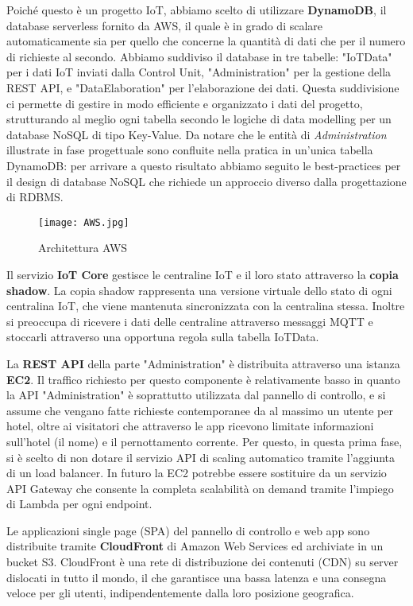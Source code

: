 Poiché questo è un progetto IoT, abbiamo scelto di utilizzare \textbf{DynamoDB}, il database serverless fornito da AWS, il quale è in grado di scalare automaticamente sia per quello che concerne la quantità di dati che per il numero di richieste al secondo.
Abbiamo suddiviso il database in tre tabelle: "IoTData" per i dati IoT inviati dalla Control Unit, "Administration" per la gestione della REST API, e "DataElaboration" per l'elaborazione dei dati. 
Questa suddivisione ci permette di gestire in modo efficiente e organizzato i dati del progetto, strutturando al meglio ogni tabella secondo le logiche di data modelling per un database NoSQL di tipo Key-Value.
Da notare che le entità di \textit{Administration} illustrate in fase progettuale sono confluite nella pratica in un'unica tabella DynamoDB: per arrivare a questo risultato abbiamo seguito le best-practices per il design di database NoSQL che richiede un approccio diverso dalla progettazione di RDBMS.

\begin{figure}[H]
    \texttt{[image: AWS.jpg]}
    \centering
    \caption[aws]{Architettura AWS}
    \label{fig:aws}
\end{figure}

Il servizio \textbf{IoT Core} gestisce le centraline IoT e il loro stato attraverso la \textbf{copia shadow}. La copia shadow rappresenta una versione virtuale dello stato di ogni centralina IoT, che viene mantenuta sincronizzata con la centralina stessa. Inoltre si preoccupa di ricevere i dati delle centraline attraverso messaggi MQTT e stoccarli attraverso una opportuna regola sulla tabella IoTData.

La \textbf{REST API} della parte "Administration" è distribuita attraverso una istanza \textbf{EC2}.
Il traffico richiesto per questo componente è relativamente basso in quanto la API "Administration" è soprattutto utilizzata dal pannello di controllo, e si assume che vengano fatte richieste contemporanee da al massimo un utente per hotel, oltre ai visitatori che attraverso le app ricevono limitate informazioni sull'hotel (il nome) e il pernottamento corrente.
Per questo, in questa prima fase, si è scelto di non dotare il servizio API di scaling automatico tramite l'aggiunta di un load balancer.
In futuro la EC2 potrebbe essere sostituire da un servizio API Gateway che consente la completa scalabilità on demand tramite l'impiego di Lambda per ogni endpoint.

Le applicazioni single page (SPA) del pannello di controllo e web app sono distribuite tramite \textbf{CloudFront} di Amazon Web Services ed archiviate in un bucket S3. CloudFront è una rete di distribuzione dei contenuti (CDN) su server dislocati in tutto il mondo, il che garantisce una bassa latenza e una consegna veloce per gli utenti, indipendentemente dalla loro posizione geografica.

